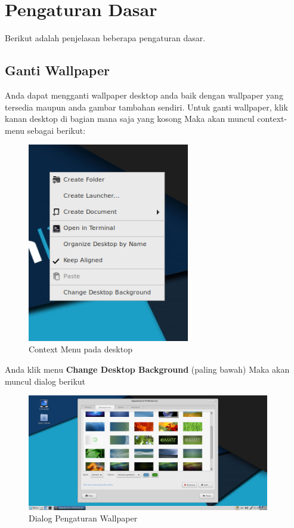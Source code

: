 \documentclass[12pt,]{article}
\begin{document}
	\newpage
	\section{Pengaturan Dasar}

	Berikut adalah penjelasan beberapa pengaturan dasar.
	
	\subsection{Ganti Wallpaper}
	
	Anda dapat mengganti wallpaper desktop anda baik dengan wallpaper yang tersedia maupun anda gambar tambahan sendiri.
	Untuk ganti wallpaper, klik kanan desktop di bagian mana saja yang kosong
	Maka akan muncul context-menu sebagai berikut:
	
	\begin{figure}[h]
		\centering
		\includegraphics[width=200pt]{png/contextmenu}
		\caption{Context Menu pada desktop}
	\end{figure} 

	Anda klik menu \textbf{Change Desktop Background} (paling bawah)
	Maka akan muncul dialog berikut
	
	\begin{figure}[h]
		\centering
		\includegraphics[width=300pt]{png/wallpaperdlg}
		\caption{Dialog Pengaturan Wallpaper}
	\end{figure}
	
\end{document}
